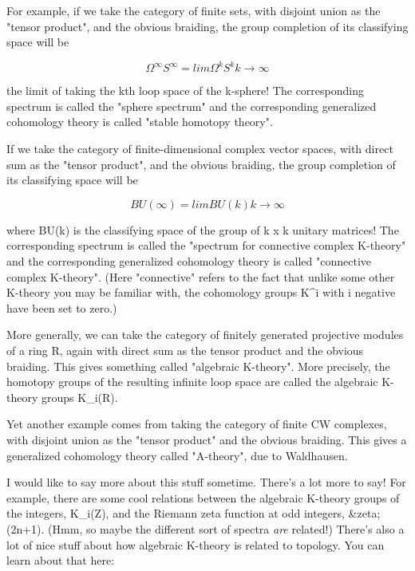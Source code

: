 For example, if we take the category of finite sets, with disjoint
union as the "tensor product", and the obvious braiding, 
the group completion of its classifying space will be


$$

\Omega ^{\infty } S^{\infty }  =  lim  \Omega ^{k} S^{k}
         k \to  \infty 
$$
    

the limit of taking the kth loop space of the k-sphere!  The
corresponding spectrum is called the "sphere spectrum" and
the corresponding generalized cohomology theory is called "stable
homotopy theory".

If we take the category of finite-dimensional complex vector spaces,
with direct sum as the "tensor product", and the obvious
braiding, the group completion of its classifying space will be


$$

BU(\infty ) =   lim        BU(k)
              k \to  \infty 
$$
    

where BU(k) is the classifying space of the group of k x k unitary
matrices!  The corresponding spectrum is called the "spectrum for
connective complex K-theory" and the corresponding generalized
cohomology theory is called "connective complex K-theory".  (Here
"connective" refers to the fact that unlike some other K-theory you
may be familiar with, the cohomology groups K^{i} with i negative have
been set to zero.)

More generally, we can take the category of finitely generated
projective modules of a ring R, again
with direct sum as the tensor product and the obvious braiding.  This
gives something called "algebraic K-theory".  More precisely, the 
homotopy 
groups of the resulting infinite loop space are called the algebraic K-theory
groups K_{i}(R).  

Yet another example comes from taking the category of finite CW
complexes, with disjoint union as the "tensor product" and the obvious
braiding.  This gives a generalized cohomology theory called
"A-theory", due to Waldhausen.

I would like to say more about this stuff sometime.  There's a lot more 
to say!  For example, there are some cool relations between the algebraic 
K-theory groups of the integers, K_{i}(Z), and 
the Riemann zeta function at odd integers, &zeta;(2n+1).
(Hmm, so maybe the different sort of spectra \emph{are} related!)  There's 
also a lot of nice stuff about how algebraic K-theory is related to topology.
You can learn about that here:

